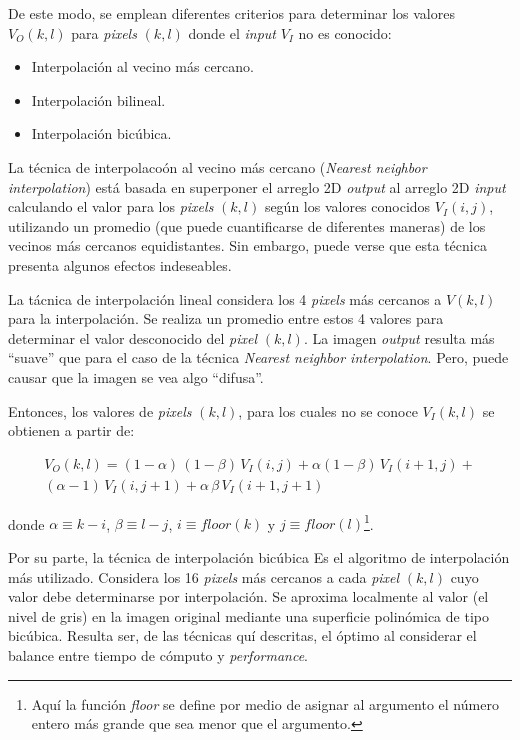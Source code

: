 %
De este modo, se emplean diferentes criterios para determinar los valores $V_{O}(k, l)$ para \textit{pixels} $(k, l)$ donde el \textit{input} $V_{I}$ no es
conocido:

\begin{itemize}
 \item Interpolaci\'on al vecino m\'as cercano.
 \item Interpolaci\'on bilineal.
 \item Interpolaci\'on bic\'ubica.
\end{itemize}

La t\'ecnica de interpolaco\'on al vecino m\'as cercano (\textit{Nearest neighbor interpolation}) est\'a basada en superponer el arreglo 2D \textit{output}
al arreglo 2D \textit{input} calculando el valor para los \textit{pixels} $(k, l)$ seg\'un los valores conocidos $V_{I}(i, j)$, utilizando un promedio
(que puede cuantificarse de diferentes maneras) de
los vecinos m\'as cercanos equidistantes.
%
Sin embargo, puede verse que esta t\'ecnica presenta algunos efectos indeseables.
%

%
La t\'acnica de interpolaci\'on lineal considera los 4 \textit{pixels} m\'as cercanos a $V(k, l)$ para la interpolaci\'on.
%
Se realiza un promedio entre estos 4 valores para determinar el valor desconocido del \textit{pixel} $(k, l)$.
%
La imagen \textit{output} resulta m\'as ``suave'' que para el caso de la t\'ecnica \textit{Nearest neighbor interpolation}.
%
Pero, puede causar que la imagen se vea algo ``difusa''.
%

%
Entonces, los valores de \textit{pixels} $(k, l)$, para los cuales no se conoce $V_{I}(k, l)$ se obtienen a partir de:


\begin{eqnarray}
	V_{O}(k, l) = (1 - \alpha)\, (1-\beta) \, V_{I}(i,j) + \alpha (1 - \beta) \, V_{I}(i +1, j) + \nonumber \\
	(\alpha -1) \, V_{I}(i, j+1) + \alpha \, \beta \, V_{I}(i +1, j +1)
\label{EqXXIX}
\end{eqnarray}

donde $\alpha \equiv k - i$, $\beta \equiv l -j$, $i \equiv floor(k)$ y $j \equiv floor(l)$\footnote{Aqu\'i la funci\'on \textit{floor}
se define por medio de asignar al argumento el n\'umero entero m\'as grande que sea menor que el argumento.}.


Por su parte, la t\'ecnica de interpolaci\'on bic\'ubica Es el algoritmo de interpolaci\'on m\'as utilizado.
%
Considera los 16 \textit{pixels} m\'as cercanos a cada \textit{pixel} $(k, l)$ cuyo valor debe determinarse por interpolaci\'on.
%
Se aproxima localmente al valor (el nivel de gris) en la imagen original mediante una superficie polin\'omica de tipo bic\'ubica.
%
Resulta ser, de las t\'ecnicas qu\'i descritas, el \'optimo al considerar el balance entre tiempo de c\'omputo y \textit{performance}.
%

